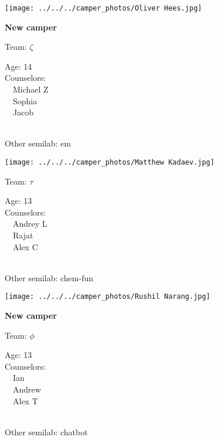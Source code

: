 \documentclass[10pt,letterpaper, landscape]{article}
\begin{document}
\verticalshiftfornextsticker
\renewcommand{\baselinestretch}{1} \begin{sticker}
\noindent\begin{minipage}{0.5\textwidth}\texttt{[image: ../../../camper\_photos/Oliver Hees.jpg]}\end{minipage}\begin{minipage}{0.45\textwidth}
\textbf{New camper} 

Team: {\Large $\zeta$}

Age:        14\\
Counselors: \\\ \ Michael Z\\\ \ Sophia\\\ \ Jacob\\
\end{minipage} \\ \vspace{0.07in}
Other semilab: em
\end{sticker}
\horizontalshiftfornextsticker
\renewcommand{\baselinestretch}{1} \begin{sticker}
\noindent\begin{minipage}{0.5\textwidth}\texttt{[image: ../../../camper\_photos/Matthew Kadaev.jpg]}\end{minipage}\begin{minipage}{0.45\textwidth}
Team: {\Large $\tau$}

Age:        13\\
Counselors: \\\ \ Andrey L\\\ \ Rajat\\\ \ Alex C\\
\end{minipage} \\ \vspace{0.07in}
Other semilab: chem-fun
\end{sticker}
\horizontalshiftfornextsticker
\renewcommand{\baselinestretch}{1} \begin{sticker}
\noindent\begin{minipage}{0.5\textwidth}\texttt{[image: ../../../camper\_photos/Rushil Narang.jpg]}\end{minipage}\begin{minipage}{0.45\textwidth}
\textbf{New camper} 

Team: {\Large $\phi$}

Age:        13\\
Counselors: \\\ \ Ian\\\ \ Andrew\\\ \ Alex T\\
\end{minipage} \\ \vspace{0.07in}
Other semilab: chatbot
\end{sticker}
\end{document}
